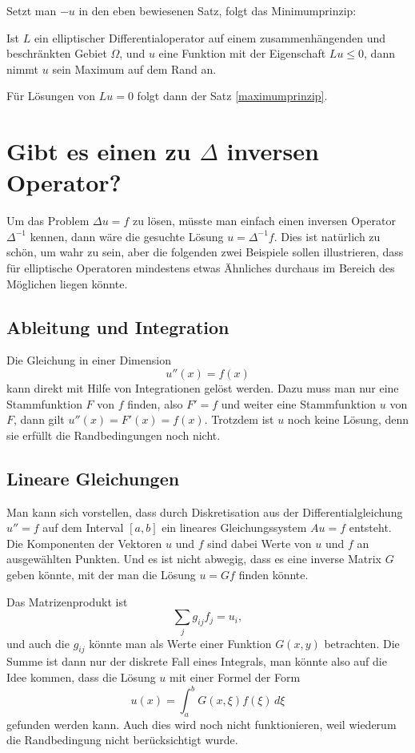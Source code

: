 {Setzt man $-u$ in den eben bewiesenen Satz, folgt das Minimumprinzip:
\begin{satz}
Ist $L$ ein elliptischer Differentialoperator auf einem zusammenhängenden
und beschränkten Gebiet $\Omega$,
und $u$ eine Funktion mit der Eigenschaft $Lu\le0$,
dann nimmt $u$ sein Maximum auf dem Rand an.
\end{satz}

Für Lösungen von $Lu=0$ folgt dann der Satz \ref{maximumprinzip}.
}

\section{Gibt es einen zu $\Delta$ inversen Operator?}
Um das Problem $\Delta u=f$ zu lösen, müsste man einfach einen
inversen Operator $\Delta^{-1}$ kennen, dann wäre die gesuchte
Lösung $u=\Delta^{-1}f$. Dies ist natürlich zu schön, um wahr
zu sein, aber die folgenden zwei Beispiele sollen illustrieren,
dass für elliptische Operatoren
mindestens etwas Ähnliches durchaus im Bereich des Möglichen
liegen könnte.

\subsection{Ableitung und Integration}
Die Gleichung in einer Dimension
\[
u''(x)=f(x)
\]
kann direkt mit Hilfe von Integrationen gelöst werden. Dazu muss
man nur eine Stammfunktion $F$ von $f$ finden, also $F' = f$ und
weiter eine Stammfunktion $u$ von $F$, dann gilt
$u''(x)=F'(x)=f(x)$. Trotzdem ist $u$ noch keine Lösung, denn 
sie erfüllt die Randbedingungen noch nicht.

\subsection{Lineare Gleichungen}
Man kann sich vorstellen, dass durch Diskretisation aus der 
Differentialgleichung $u''=f$ auf dem Interval $[a,b]$ ein lineares Gleichungssystem
$Au=f$ entsteht. Die Komponenten der Vektoren $u$ und $f$ sind dabei
Werte von $u$ und $f$ an ausgewählten Punkten. Und es ist nicht
abwegig, dass es eine inverse Matrix $G$ geben könnte, mit der man
die Lösung $u=Gf$ finden könnte.

Das Matrizenprodukt ist
\[
\sum_{j}g_{ij}f_j = u_i,
\]
und auch die $g_{ij}$ könnte man als Werte einer Funktion $G(x,y)$
betrachten. Die Summe ist dann nur der diskrete Fall eines Integrals,
man könnte also auf die Idee kommen, dass
die Lösung $u$ mit einer Formel der Form
\[
u(x)=\int_a^b G(x,\xi)f(\xi)\,d\xi
\]
gefunden werden kann. Auch dies wird noch nicht funktionieren,
weil wiederum die Randbedingung nicht berücksichtigt wurde.

